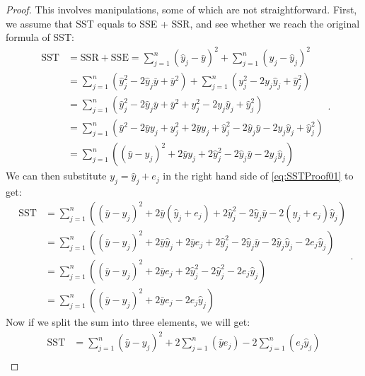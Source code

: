 \documentclass[
]{book}
\theoremstyle{definition}
\theoremstyle{definition}
\theoremstyle{definition}
\theoremstyle{definition}
\theoremstyle{remark}
\begin{document}
\begin{proof}
This involves manipulations, some of which are not straightforward. First, we assume that SST equals to SSE + SSR, and see whether we reach the original formula of SST:
\begin{equation}
    \begin{aligned}
        \mathrm{SST} &= \mathrm{SSR} + \mathrm{SSE} = \sum_{j=1}^n (\hat{y}_j - \bar{y})^2 + \sum_{j=1}^n (y_j - \hat{y}_j)^2 \\
        &= \sum_{j=1}^n \left( \hat{y}_j^2 - 2 \hat{y}_j \bar{y} + \bar{y}^2 \right) + \sum_{j=1}^n \left( y_j^2 - 2 y_j \hat{y}_j + \hat{y}_j^2 \right) \\
        &= \sum_{j=1}^n \left( \hat{y}_j^2 - 2 \hat{y}_j \bar{y} + \bar{y}^2 + y_j^2 - 2 y_j \hat{y}_j + \hat{y}_j^2 \right) \\
        &= \sum_{j=1}^n \left(\bar{y}^2 -2 \bar{y} y_j + y_j^2 + 2 \bar{y} y_j + \hat{y}_j^2 - 2 \hat{y}_j \bar{y} - 2 y_j \hat{y}_j + \hat{y}_j^2 \right) \\
        &= \sum_{j=1}^n \left((\bar{y} - y_j)^2 + 2 \bar{y} y_j + 2 \hat{y}_j^2 - 2 \hat{y}_j \bar{y} - 2 y_j \hat{y}_j \right)
    \end{aligned} .
    \label{eq:SSTProof01}
\end{equation}
We can then substitute \(y_j=\hat{y}_j+e_j\) in the right hand side of \eqref{eq:SSTProof01} to get:
\begin{equation}
    \begin{aligned}
        \mathrm{SST} &= \sum_{j=1}^n \left((\bar{y} - y_j)^2 + 2 \bar{y} (\hat{y}_j+e_j) + 2 \hat{y}_j^2 - 2 \hat{y}_j \bar{y} - 2 (\hat{y}_j+e_j) \hat{y}_j \right) \\
        &= \sum_{j=1}^n \left((\bar{y} - y_j)^2 + 2 \bar{y} \hat{y}_j + 2 \bar{y} e_j + 2 \hat{y}_j^2 - 2 \hat{y}_j \bar{y} - 2 \hat{y}_j\hat{y}_j -2 e_j \hat{y}_j \right) \\
        &= \sum_{j=1}^n \left((\bar{y} - y_j)^2 + 2 \bar{y} e_j + 2 \hat{y}_j^2 - 2 \hat{y}_j^2 -2 e_j \hat{y}_j \right) \\
        &= \sum_{j=1}^n \left((\bar{y} - y_j)^2 + 2 \bar{y} e_j - 2 e_j \hat{y}_j \right) 
    \end{aligned} .
    \label{eq:SSTProof02}
\end{equation}
Now if we split the sum into three elements, we will get:
\begin{equation}
    \begin{aligned}
        \mathrm{SST} &= \sum_{j=1}^n (\bar{y} - y_j)^2 + 2 \sum_{j=1}^n \left(\bar{y} e_j\right) - 2 \sum_{j=1}^n \left(e_j \hat{y}_j \right) \\

\end{aligned}
\end{equation}
\end{proof}
\end{document}
